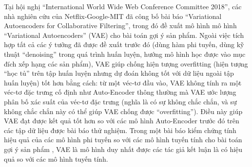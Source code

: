 Tại hội nghị ``International World Wide Web Conference Committee 2018'', các nhà nghiên cứu của Netflix-Google-MIT đã công bố bài báo ``Variational Autoencoders for Collaborative Filtering'', trong đó đề xuất mô hình mô hình ``Variational Autoencoders'' (VAE) cho bài toán gợi ý sản phẩm.
Ngoài việc tích hợp tất cả các ý tưởng đã được đề xuất trước đó (dùng hàm phi tuyến, dùng kỹ thuật ``denoising'' trong quá trình huấn luyện, hướng mô hình học được vào mục đích xếp hạng các sản phẩm), VAE giúp chống hiện tượng overfitting (hiện tượng ``học tủ'' trên tập huấn luyện nhưng dự đoán không tốt với dữ liệu ngoài tập huấn luyện) tốt hơn bằng cách: từ một véc-tơ đầu vào, VAE không tính ra một véc-tơ đặc trưng cố định như Auto-Encoder thông thường mà VAE ước lượng phân bố xác suất của véc-tơ đặc trưng (nghĩa là có sự không chắc chắn, và sự không chắc chắn này có thể giúp VAE chống được ``overfitting''). 
Điều này giúp VAE đạt được kết quả tốt hơn so với các mô hình Auto-Encoder trước đó trên các tập dữ liệu được bài báo thử nghiệm. 
Trong một bài báo kiểm chứng tính hiệu quả của các mô hình phi tuyến so với các mô hình tuyến tính cho bài toán gợi ý sản phẩm \cite{dacrema2019we}, VAE là mô hình duy nhất được các tác giả kết luận là có hiệu quả so với các mô hình tuyến tính.




